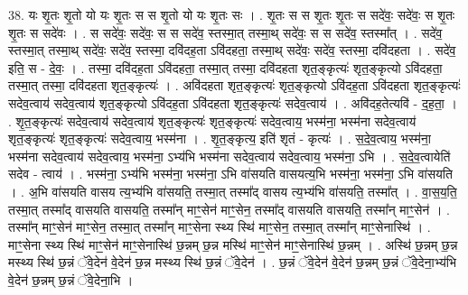 \documentclass[17pt]{extarticle}
\begin{document}
38. यः शृ॒तः शृ॒तो यो यः शृ॒तः स स शृ॒तो यो यः शृ॒तः सः । . शृ॒तः स स शृ॒तः शृ॒तः स सदे॑वः॒ सदे॑वः॒ स शृ॒तः शृ॒तः स सदे॑वः । . स सदे॑वः॒ सदे॑वः॒ स स सदे॑व॒ स्तस्मा॒त् तस्मा॒थ् सदे॑वः॒ स स सदे॑व॒ स्तस्मा᳚त् । . सदे॑व॒ स्तस्मा॒त् तस्मा॒थ् सदे॑वः॒ सदे॑व॒ स्तस्मा॒ दवि॑दह॒ता ऽवि॑दहता॒ तस्मा॒थ् सदे॑वः॒ सदे॑व॒ स्तस्मा॒ दवि॑दहता । . सदे॑व॒ इति॒ स - दे॒वः॒ । . तस्मा॒ दवि॑दह॒ता ऽवि॑दहता॒ तस्मा॒त् तस्मा॒ दवि॑दहता शृत॒ङ्कृत्यः॑ शृत॒ङ्कृत्यो ऽवि॑दहता॒ तस्मा॒त् तस्मा॒ दवि॑दहता शृत॒ङ्कृत्यः॑ । . अवि॑दहता शृत॒ङ्कृत्यः॑ शृत॒ङ्कृत्यो ऽवि॑दह॒ता ऽवि॑दहता शृत॒ङ्कृत्यः॑ सदेव॒त्वाय॑ सदेव॒त्वाय॑ शृत॒ङ्कृत्यो ऽवि॑दह॒ता ऽवि॑दहता शृत॒ङ्कृत्यः॑ सदेव॒त्वाय॑ । . अवि॑दह॒तेत्यवि॑ - द॒ह॒ता॒ । . शृ॒त॒ङ्कृत्यः॑ सदेव॒त्वाय॑ सदेव॒त्वाय॑ शृत॒ङ्कृत्यः॑ शृत॒ङ्कृत्यः॑ सदेव॒त्वाय॒ भस्म॑ना॒ भस्म॑ना सदेव॒त्वाय॑ शृत॒ङ्कृत्यः॑ शृत॒ङ्कृत्यः॑ सदेव॒त्वाय॒ भस्म॑ना । . शृ॒त॒ङ्कृत्य॒ इति॑ शृतं - कृत्यः॑ । . स॒दे॒व॒त्वाय॒ भस्म॑ना॒ भस्म॑ना सदेव॒त्वाय॑ सदेव॒त्वाय॒ भस्म॑ना॒ ऽभ्य॑भि भस्म॑ना सदेव॒त्वाय॑ सदेव॒त्वाय॒ भस्म॑ना॒ ऽभि । . स॒दे॒व॒त्वायेति॑ सदेव - त्वाय॑ । . भस्म॑ना॒ ऽभ्य॑भि भस्म॑ना॒ भस्म॑ना॒ ऽभि वा॑सयति वासयत्य॒भि भस्म॑ना॒ भस्म॑ना॒ ऽभि वा॑सयति । . अ॒भि वा॑सयति वासय त्य॒भ्य॑भि वा॑सयति॒ तस्मा॒त् तस्मा᳚द् वासय त्य॒भ्य॑भि वा॑सयति॒ तस्मा᳚त् । . वा॒स॒य॒ति॒ तस्मा॒त् तस्मा᳚द् वासयति वासयति॒ तस्मा᳚न् माꣳ॒॒सेन॑ माꣳ॒॒सेन॒ तस्मा᳚द् वासयति वासयति॒ तस्मा᳚न् माꣳ॒॒सेन॑ । . तस्मा᳚न् माꣳ॒॒सेन॑ माꣳ॒॒सेन॒ तस्मा॒त् तस्मा᳚न् माꣳ॒॒सेना स्थ्य स्थि॑ माꣳ॒॒सेन॒ तस्मा॒त् तस्मा᳚न् माꣳ॒॒सेनास्थि॑ । . माꣳ॒॒सेना स्थ्य स्थि॑ माꣳ॒॒सेन॑ माꣳ॒॒सेनास्थि॑ छ॒न्नम् छ॒न्न मस्थि॑ माꣳ॒॒सेन॑ माꣳ॒॒सेनास्थि॑ छ॒न्नम् । . अस्थि॑ छ॒न्नम् छ॒न्न मस्थ्य स्थि॑ छ॒न्नं ॅवे॒देन॑ वे॒देन॑ छ॒न्न मस्थ्य स्थि॑ छ॒न्नं ॅवे॒देन॑ । . छ॒न्नं ॅवे॒देन॑ वे॒देन॑ छ॒न्नम् छ॒न्नं ॅवे॒देना॒भ्य॑भि वे॒देन॑ छ॒न्नम् छ॒न्नं ॅवे॒देना॒भि । \newline
\end{document}
